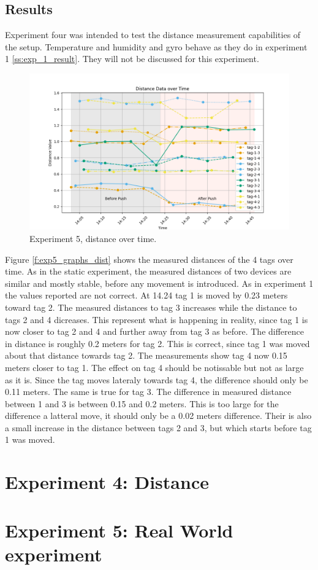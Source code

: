 \subsection{Results}
\label{ss:exp_4_result}

Experiment four was intended to test the distance measurement capabilities of the setup.
Temperature and humidity and gyro behave as they do in experiment 1 \ref{ss:exp_1_result}.
They will not be discussed for this experiment.

\begin{figure}[ht!]
	\includegraphics[width=\linewidth]{graphics/exp/exp5_dist_data_plot_2.png}
	\caption{Experiment 5, distance over time.}
	\label{f:exp3_graphs_dist}
\end{figure}

Figure \ref{f:exp5_graphs_dist} shows the measured distances of the 4 tags over time.
As in the static experiment, the measured distances of two devices are similar and mostly stable, before any movement is introduced.
As in experiment 1 the values reported are not correct.
At 14.24 tag 1 is moved by 0.23 meters toward tag 2.
The measured distances to tag 3 increases while the distance to tags 2 and 4 dicreases.
This represent what is happening in reality, since tag 1 is now closer to tag 2 and 4 and further away from tag 3 as before.
The difference in distance is roughly 0.2 meters for tag 2.
This is correct, since tag 1 was moved about that distance towards tag 2.
The measurements show tag 4 now 0.15 meters closer to tag 1.
The effect on tag 4 should be notissable but not as large as it is.
Since the tag moves lateraly towards tag 4, the difference should only be 0.11 meters.
The same is true for tag 3.
The difference in measured distance between 1 and 3 is between 0.15 and 0.2 meters. 
This is too large for the difference a latteral move, it should only be a 0.02 meters difference.
Their is also a small increase in the distance between tags 2 and 3, but which starts before tag 1 was moved.


\section{Experiment 4: Distance}
\label{s:exp_5_real_world}


\section{Experiment 5: Real World experiment}
\label{s:exp_5_real_world}